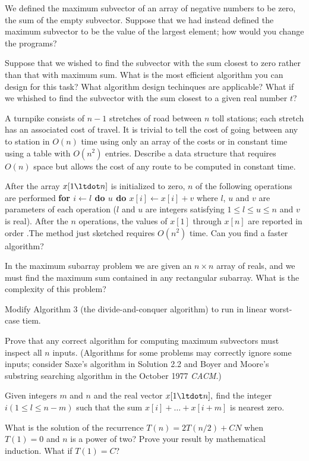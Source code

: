 \prob
We defined the maximum subvector of an array of negative numbers to be zero, the
sum of the empty subvector. Suppose that we had instead defined the maximum
subvector to be the value of the largest element; how would you change the
programs?

\prob
Suppose that we wished to find the subvector with the sum closest to zero rather
than that with maximum sum. What is the most efficient algorithm you can design
for this task? What algorithm design techinques are applicable? What if we
whished to find the subvector with the sum closest to a given real number $t$?

\prob
A turnpike consists of $n-1$ stretches of road between $n$ toll stations; each
stretch has an associated cost of travel. It is trivial to tell the cost of going
between any to station in $O(n)$ time using only an array of the costs or in
constant time using a table with $O(n^2)$ entries. Describe a data structure that
requires $O(n)$ space but allows the cost of any route to be computed in constant
time.

\prob
After the array $x[1\ltdot n]$ is initialized to zero, $n$ of the following
operations are performed
\begindisplay
\vbox{
\+\bf for $i\leftarrow l$ do $u$ do\cr
\+\quad $x[i]\leftarrow x[i]+v$\cr}
\enddisplay
where $l$, $u$ and $v$ are parameters of each operation ($l$ and $u$ are integers
satisfying $1\le l\le u\le n$ and $v$ is real). After the $n$ operations, the
values of $x[1]$ through $x[n]$ are reported in order .The method just sketched
requires $O(n^2)$ time. Can you find a faster algorithm?

\prob
In the maximum subarray problem we are given an $n\times n$ array of reals, and
we must find the maximum sum contained in any rectangular subarray. What is the
complexity of this problem?

\prob
Modify Algorithm 3 (the divide-and-conquer algorithm) to run in linear worst-case
tiem.

\prob
Prove that any correct algorithm for computing maximum subvectors must inspect
all $n$ inputs. (Algorithms for some problems may correctly ignore some inputs;
consider Saxe's algorithm in Solution 2.2 and Boyer and Moore's substring
searching algorithm in the October 1977 {\sl CACM\/}.)

\prob
Given integers $m$ and $n$ and the real vector $x[1\ltdot n],$ find the integer
$i(1\le l\le n-m)$ such that the sum $x[i]+\ldots+x[i+m]$ is nearest zero.

\prob
What is the solution of the recurrence $T(n)=2T(n/2)+CN$ when $T(1)=0$ and $n$ is
a power of two? Prove your result by mathematical induction. What if $T(1)=C$?

